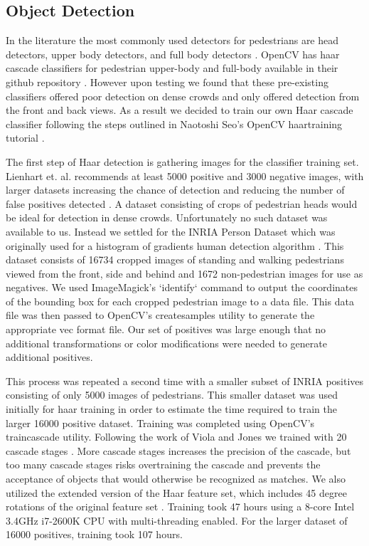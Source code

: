 \documentclass[12pt, onecolumn, conference]{IEEEtran}
\begin{document}
\subsection{Object Detection}

In the literature the most commonly used detectors for pedestrians are head detectors, upper body detectors, and full body detectors \cite{G. Shu}\cite{P. Viola}. OpenCV has haar cascade classifiers for pedestrian upper-body and full-body available in their github repository \cite{Itseez}. However upon testing we found that these pre-existing classifiers offered poor detection on dense crowds and only offered detection from the front and back views. As a result we decided to train our own Haar cascade classifier following the steps outlined in Naotoshi Seo’s OpenCV haartraining tutorial \cite{N. Seo}. 

The first step of Haar detection is gathering images for the classifier training set. Lienhart et. al. recommends at least 5000 positive and 3000 negative images, with larger datasets increasing the chance of detection and reducing the number of false positives detected \cite{R. Lienhart 1}. A dataset consisting of crops of pedestrian heads would be ideal for detection in dense crowds. Unfortunately no such dataset was available to us. Instead we settled for the INRIA Person Dataset which was originally used for a histogram of gradients human detection algorithm \cite{INRIA}\cite{N. Dalal}. This dataset consists of  16734 cropped images of standing and walking pedestrians viewed from the front, side and behind and 1672 non-pedestrian images for use as negatives. We used ImageMagick’s `identify` command to output the coordinates of the bounding box for each cropped pedestrian image to a data file. This data file was then passed to OpenCV’s createsamples utility to generate the appropriate vec format file. Our set of positives was large enough that no additional transformations or color modifications were needed to generate additional positives. 

This process was repeated a second time with a smaller subset of INRIA positives consisting of only 5000 images of pedestrians. This smaller dataset was used initially for haar training in order to estimate the time required to train the larger 16000 positive dataset. Training was completed using OpenCV’s traincascade utility. Following the work of Viola and Jones we trained with 20 cascade stages \cite{P. Viola}. More cascade stages increases the precision of the cascade, but too many cascade stages risks overtraining the cascade and prevents the acceptance of objects that would otherwise be recognized as matches. We also utilized the extended version of the Haar feature set, which includes 45 degree rotations of the original feature set \cite{R. Lienhart 2}. Training took 47 hours using a 8-core Intel 3.4GHz i7-2600K CPU with multi-threading enabled. For the larger dataset of 16000 positives, training took 107 hours. 
\end{document}

